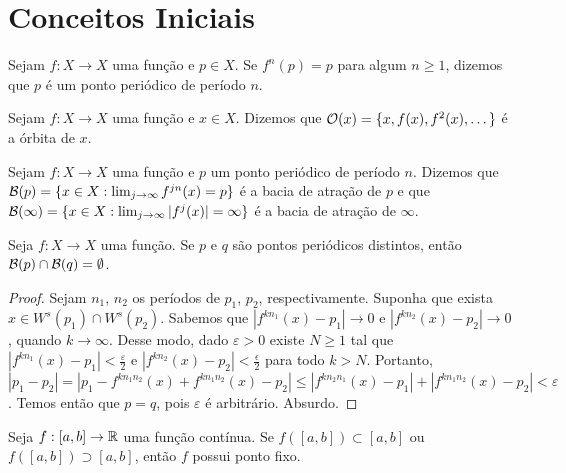 \section{Conceitos Iniciais}

\begin{definition}
Sejam $f: X \to X$ uma função e $p \in X$. Se $f^n(p) = p$ para algum $n \geq 1$, dizemos que $p$ é um ponto periódico de período $n$.
\end{definition}

\begin{definition}
Sejam $f: X \to X$ uma função e $x \in X$. Dizemos que $\mathcal{O}(x) = \{ x, f(x), f^2(x), \dots \}$ é a órbita de $x$.
\end{definition}

\begin{definition}
Sejam $f: X \to X$ uma função e $p$ um ponto periódico de período $n$. Dizemos que $\mathcal{B} (p) = \{ x \in  X: \lim_{j \to \infty} f^{jn}(x) = p \}$ é a bacia de atração de $p$ e que $\mathcal{B} (\infty) = \{ x \in  X: \lim_{j \to \infty} |f^j(x)| = \infty \}$ é a bacia de atração de $\infty$.
\end{definition}

\begin{proposition}
Seja $f: X \to X$ uma função. Se $p$ e $q$ são pontos periódicos distintos, então $\mathcal{B}(p) \cap \mathcal{B}(q) = \emptyset$.
\end{proposition}

\begin{proof}
Sejam $n_1$, $n_2$ os períodos de $p_1$, $p_2$, respectivamente. Suponha que exista $x \in W^s(p_1) \cap W^s(p_2)$. Sabemos que $|f^{kn_1}(x) - p_1| \to 0$ e $|f^{kn_2}(x) - p_2| \to 0$, quando $k \to \infty$. Desse modo, dado $\varepsilon > 0$ existe $N \geq 1$ tal que $|f^{kn_1}(x) - p_1| < \frac{\varepsilon}{2}$ e $|f^{kn_2}(x) - p_2| < \frac{\epsilon}{2}$ para todo $k > N$. Portanto, $|p_1 - p_2| = |p_1 - f^{kn_1n_2}(x) + f^{kn_1n_2}(x) - p_2| \leq |f^{kn_2n_1}(x) - p_1| + |f^{kn_1n_2}(x) - p_2| < \varepsilon$. Temos então que $p = q$, pois $\varepsilon$ é arbitrário. Absurdo.
\end{proof}

\begin{proposition} \label{prop 1-1}
Seja $f: [a, b] \to \mathbb{R}$ uma função contínua. Se $f([a, b]) \subset [a, b]$ ou $f([a, b]) \supset [a, b]$, então $f$ possui ponto fixo.
\end{proposition}

